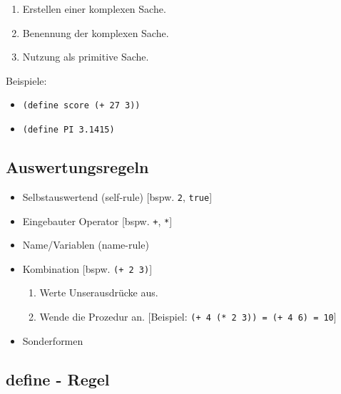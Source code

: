 \documentclass[12pt]{scrreprt}
\begin{document}
                \begin{enumerate}
                    \item Erstellen einer komplexen Sache.
                    \item Benennung der komplexen Sache.
                    \item Nutzung als primitive Sache.
                \end{enumerate}

                Beispiele:
                \begin{itemize}
                    \item \texttt{(define score (+ 27 3))}
                    \item \texttt{(define PI 3.1415)}
                \end{itemize}


            \subsection{Auswertungsregeln}
                \label{ss:drracket_struktur_auswertung}

                \begin{itemize}
                    \item Selbstauswertend (self-rule) [bspw. \texttt{2}, \texttt{true}]
                    \item Eingebauter Operator [bspw. \texttt{+}, \texttt{*}]
                    \item Name/Variablen (name-rule)
                    \item
                        Kombination [bspw. \texttt{(+ 2 3)}]
                        \begin{enumerate}
                            \item Werte Unserausdrücke aus.
                            \item Wende die Prozedur an. [Beispiel: \texttt{(+ 4 (* 2 3)) = (+ 4 6) = 10}]
                        \end{enumerate}
                    \item Sonderformen
                \end{itemize}


            \subsection{define - Regel}
                \label{ss:drracket_struktur_define}
\end{document}
